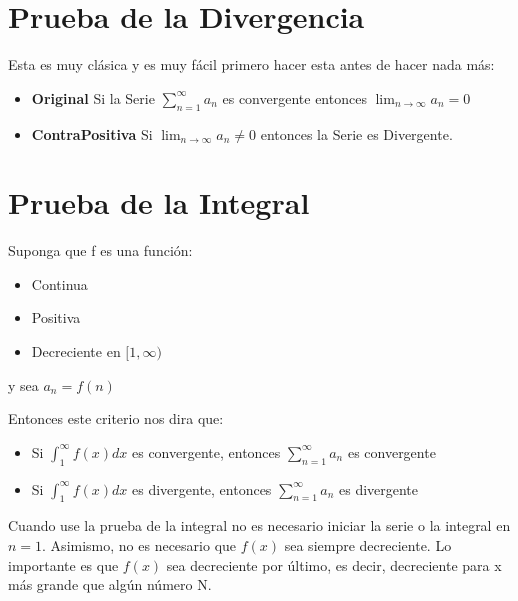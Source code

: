 \documentclass[12pt]{report}                                %
\begin{document}
    \clearpage
    \section{Prueba de la Divergencia}
        Esta es muy clásica y es muy fácil primero hacer esta antes
        de hacer nada más:

        \begin{itemize}
            \item \textbf{Original} Si la Serie $\sum_{n=1}^{\infty} a_n$ es
            convergente entonces $\lim_{n \to \infty} a_n = 0$

            \item \textbf{ContraPositiva} Si $\lim_{n \to \infty} a_n \neq 0$ entonces la Serie es Divergente.
        \end{itemize}

    \clearpage
    \section{Prueba de la Integral}
        Suponga que f es una función:

        \begin{itemize}
            \item Continua
            \item Positiva
            \item Decreciente en $[1, \infty)$
        \end{itemize}

        y sea $a_n = f(n)$

        Entonces este criterio nos dira que:
        \begin{itemize}
           \item Si $\int_1^{\infty}f(x) dx$ es convergente, entonces $\sum_{n=1}^{\infty} a_n$ es convergente
           \item Si $\int_1^{\infty}f(x) dx$ es divergente, entonces $\sum_{n=1}^{\infty} a_n$ es divergente
        \end{itemize}

        Cuando use la prueba de la integral no es necesario iniciar la serie o la integral en $n=1$.
        Asimismo, no es necesario que $f(x)$ sea siempre decreciente.
        Lo importante es que $f(x)$ sea decreciente por último, es decir, decreciente para x más
        grande que algún número N. 
\end{document}
